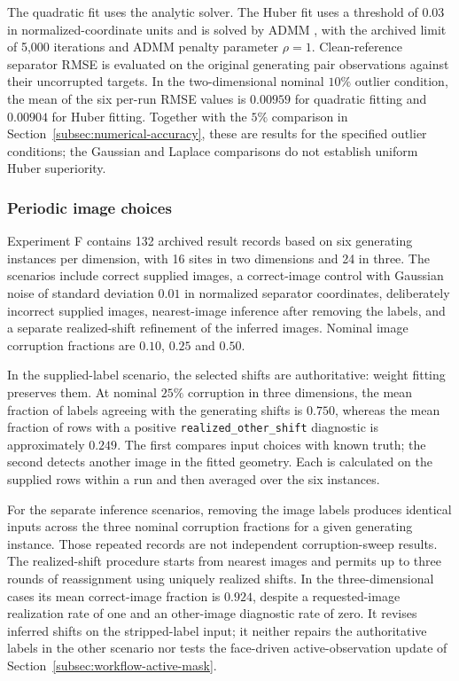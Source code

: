 The quadratic fit uses the analytic solver. The Huber fit uses a threshold of
$0.03$ in normalized-coordinate units and is solved by ADMM \citep{Boyd2011},
with the archived limit of
5,000 iterations and ADMM penalty parameter $\rho=1$. Clean-reference separator RMSE is
evaluated on the original generating pair observations against their
uncorrupted targets. In the two-dimensional nominal $10\%$ outlier condition,
the mean of the six per-run RMSE values is $0.00959$ for quadratic fitting
and $0.00904$ for Huber fitting. Together with the $5\%$ comparison in
Section~\ref{subsec:numerical-accuracy}, these are results for the specified
outlier conditions; the Gaussian and Laplace comparisons do not establish
uniform Huber superiority.

\subsubsection{Periodic image choices}
\label{app:synthetic-images}

Experiment F contains 132 archived result records based on six generating
instances per dimension, with 16 sites in two dimensions and 24 in three.
The scenarios include correct supplied images, a correct-image control with
Gaussian noise of standard deviation $0.01$ in normalized separator coordinates,
deliberately incorrect supplied images, nearest-image inference after removing the labels, and a
separate realized-shift refinement of the inferred images. Nominal image
corruption fractions are $0.10$, $0.25$ and $0.50$.

In the supplied-label scenario, the selected shifts are authoritative:
weight fitting preserves them. At nominal $25\%$ corruption in three
dimensions, the mean fraction of labels agreeing with the generating shifts
is $0.750$, whereas the mean fraction of rows with a positive
\texttt{realized\_other\_shift} diagnostic is approximately $0.249$.
The first compares input choices with known truth; the second detects another
image in the fitted geometry. Each is calculated on the supplied rows within
a run and then averaged over the six instances.

For the separate inference scenarios, removing the image labels produces
identical inputs across the three nominal corruption fractions for a given
generating instance. Those repeated records are not independent
corruption-sweep results. The realized-shift procedure starts from nearest
images and permits up to three rounds of reassignment using uniquely realized
shifts. In the three-dimensional cases its mean correct-image fraction is
$0.924$, despite a requested-image realization rate of one and an
other-image diagnostic rate of zero. It revises inferred shifts on the
stripped-label input; it neither repairs the authoritative labels in the
other scenario nor tests the face-driven active-observation update of
Section~\ref{subsec:workflow-active-mask}.

